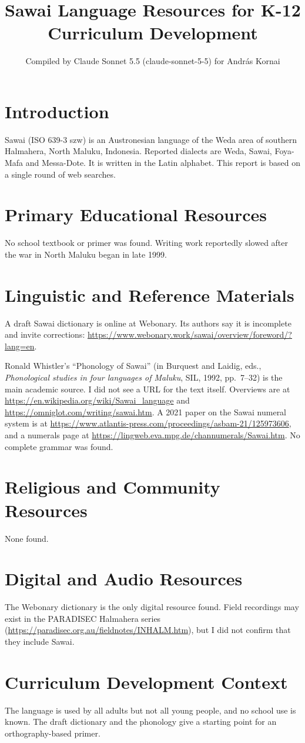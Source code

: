 \documentclass[12pt]{article}
\title{Sawai Language Resources for K-12 Curriculum Development}
\author{Compiled by Claude Sonnet 5.5 (claude-sonnet-5-5) for Andr\'as Kornai}
\date{}
\begin{document}
\maketitle

\section{Introduction}
Sawai (ISO 639-3 szw) is an Austronesian language of the Weda area of southern Halmahera, North Maluku, Indonesia. Reported dialects are Weda, Sawai, Foya-Mafa and Messa-Dote. It is written in the Latin alphabet. This report is based on a single round of web searches.

\section{Primary Educational Resources}
No school textbook or primer was found. Writing work reportedly slowed after the war in North Maluku began in late 1999.

\section{Linguistic and Reference Materials}
A draft Sawai dictionary is online at Webonary. Its authors say it is incomplete and invite corrections: \url{https://www.webonary.work/sawai/overview/foreword/?lang=en}.

Ronald Whistler's ``Phonology of Sawai'' (in Burquest and Laidig, eds., \emph{Phonological studies in four languages of Maluku}, SIL, 1992, pp.\ 7--32) is the main academic source. I did not see a URL for the text itself. Overviews are at \url{https://en.wikipedia.org/wiki/Sawai_language} and \url{https://omniglot.com/writing/sawai.htm}. A 2021 paper on the Sawai numeral system is at \url{https://www.atlantis-press.com/proceedings/asbam-21/125973606}, and a numerals page at \url{https://lingweb.eva.mpg.de/channumerals/Sawai.htm}. No complete grammar was found.

\section{Religious and Community Resources}
None found.

\section{Digital and Audio Resources}
The Webonary dictionary is the only digital resource found. Field recordings may exist in the PARADISEC Halmahera series (\url{https://paradisec.org.au/fieldnotes/INHALM.htm}), but I did not confirm that they include Sawai.

\section{Curriculum Development Context}
The language is used by all adults but not all young people, and no school use is known. The draft dictionary and the phonology give a starting point for an orthography-based primer.
\end{document}
